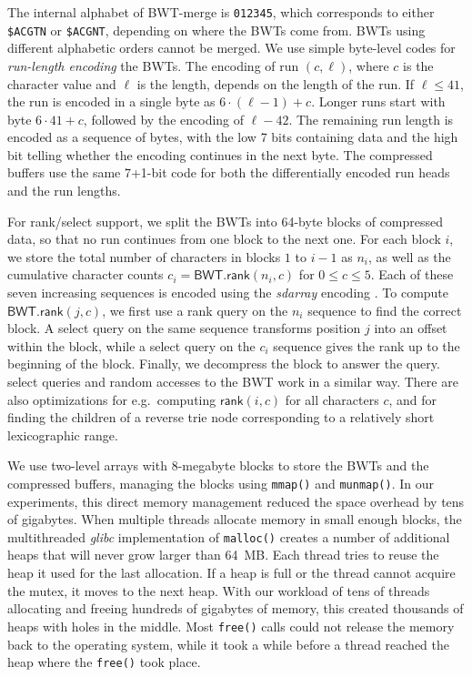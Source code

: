 \documentclass[smallabstract,smallcaptions]{dccpaper}
\newcommand{\BWT}{\textsf{BWT}}
\newcommand{\mBWT}{\ensuremath{\mathsf{BWT}}}
\newcommand{\rank}{\textsf{rank}}
\newcommand{\select}{\textsf{select}}
\newcommand{\mrank}{\ensuremath{\mathsf{rank}}}
\newcommand{\BWTmerge}{\textsf{BWT\nobreakdash-merge}}
\begin{document}
The internal alphabet of \BWTmerge{} is \texttt{012345}, which corresponds to either \texttt{\$ACGTN} or \texttt{\$ACGNT}, depending on where the \BWT{}s come from. \BWT{}s using different alphabetic orders cannot be merged. We use simple byte-level codes for \emph{run-length encoding} the \BWT{}s. The encoding of run $(c, \ell)$, where $c$ is the character value and $\ell$ is the length, depends on the length of the run. If $\ell \le 41$, the run is encoded in a single byte as $6 \cdot (\ell-1) + c$. Longer runs start with byte $6 \cdot 41 + c$, followed by the encoding of $\ell-42$. The remaining run length is encoded as a sequence of bytes, with the low 7 bits containing data and the high bit telling whether the encoding continues in the next byte. The compressed buffers use the same 7+1\nobreakdash-bit code for both the differentially encoded run heads and the run lengths.

For \rank/\select{} support, we split the \BWT{}s into 64\nobreakdash-byte blocks of compressed data, so that no run continues from one block to the next one. For each block $i$, we store the total number of characters in blocks $1$ to $i-1$ as $n_{i}$, as well as the cumulative character counts $c_{i} = \mBWT.\mrank(n_{i},c)$ for $0 \le c \le 5$. Each of these seven increasing sequences is encoded using the \emph{sdarray} encoding \cite{Okanohara2007}. To compute $\mBWT.\mrank(j,c)$, we first use a \rank{} query on the $n_{i}$ sequence to find the correct block. A \select{} query on the same sequence transforms position $j$ into an offset within the block, while a \select{} query on the $c_{i}$ sequence gives the rank up to the beginning of the block. Finally, we decompress the block to answer the query. \select{} queries and random accesses to the \BWT{} work in a similar way. There are also optimizations for e.g.~computing $\mrank(i,c)$ for all characters $c$, and for finding the children of a reverse trie node corresponding to a relatively short lexicographic range.

We use two-level arrays with 8\nobreakdash-megabyte blocks to store the \BWT{}s and the compressed buffers, managing the blocks using \texttt{mmap()} and \texttt{munmap()}. In our experiments, this direct memory management reduced the space overhead by tens of gigabytes. When multiple threads allocate memory in small enough blocks, the multithreaded \emph{glibc} implementation of \texttt{malloc()} creates a number of additional heaps that will never grow larger than 64~MB. Each thread tries to reuse the heap it used for the last allocation. If a heap is full or the thread cannot acquire the mutex, it moves to the next heap. With our workload of tens of threads allocating and freeing hundreds of gigabytes of memory, this created thousands of heaps with holes in the middle. Most \texttt{free()} calls could not release the memory back to the operating system, while it took a while before a thread reached the heap where the \texttt{free()} took place.
\end{document}
